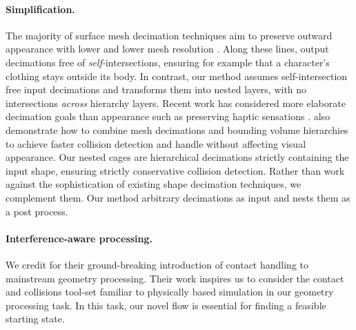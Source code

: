 
\paragraph{Simplification.}
%
The majority of surface mesh decimation techniques aim to preserve outward
appearance with lower and lower mesh resolution
\cite{Hoppe:1996:PM,Garland:1997:SSU,Melax98}.
%
Along these lines, \cite{gumhold2003intersection} output
decimations free of \emph{self-}intersections, ensuring for example that a
character's clothing stays outside its body.
%
In contrast, our method assumes self-intersection free input decimations and
transforms them into nested layers, with no intersections \emph{across}
hierarchy layers.
%
Recent work has considered more elaborate decimation goals than appearance such
as preserving haptic sensations \cite{Otaduy:2003:SPS}.
%
\cite{Otaduy:2003:CDH} also demonstrate how to combine mesh decimations and bounding
volume hierarchies to achieve faster collision detection and handle without
affecting visual appearance.
%
Our nested cages are hierarchical decimations strictly containing the input
shape, ensuring strictly conservative collision detection.
%
Rather than work against the sophistication of existing shape decimation
techniques, we complement them. Our method arbitrary decimations as input and
nests them as a post process.

\paragraph{Interference-aware processing.} We credit
\cite{ContactAwareModeling:2011} for their ground-breaking introduction of
contact handling to mainstream geometry processing. Their work inspires us to
consider the contact and collisions tool-set familiar to physically based
simulation in our geometry processing task.
%
In this task, our novel flow is essential for finding a feasible starting
state.
